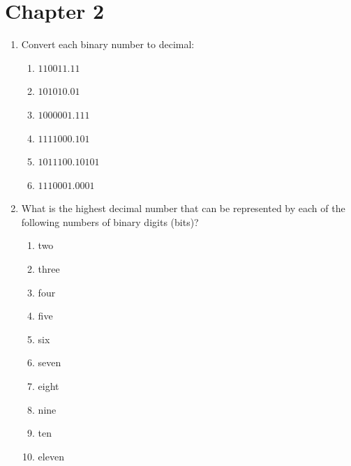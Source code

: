 \documentclass[11pt]{article}
\begin{document}

\section{Chapter 2}

\begin{enumerate}


\item Convert each binary number to decimal:

\begin{enumerate}[label=(\alph*)]
    \item $110011.11$
    \item $101010.01$
    \item $1000001.111$
    \item $1111000.101$
    \item $1011100.10101$
    \item $1110001.0001$
\end{enumerate}



\item What is the highest decimal number that can be represented by each of the following numbers of binary digits (bits)?

\begin{enumerate}[label=(\alph*)]
    \item two
    \item three
    \item four
    \item five
    \item six
    \item seven
    \item eight
    \item nine
    \item ten
    \item eleven
\end{enumerate}




\end{enumerate}
\end{document}
